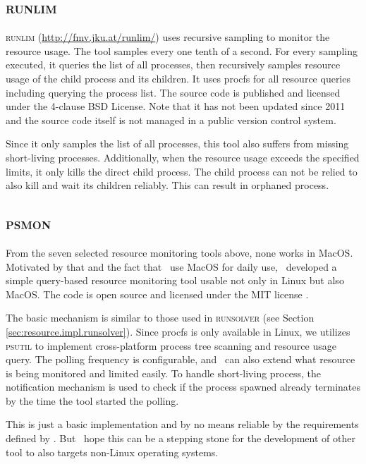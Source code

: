 \subsection{\textsc{runlim}}

\textsc{runlim} (\url{http://fmv.jku.at/runlim/}) uses recursive sampling to monitor the resource usage.
The tool samples every one tenth of a second.
For every sampling executed, it queries the list of all processes, then recursively samples resource usage of the child process and its children.
It uses procfs for all resource queries including querying the process list.
The source code is published and licensed under the 4-clause BSD License.
Note that it has not been updated since 2011 and the source code itself is not managed in a public version control system.

Since it only samples the list of all processes, this tool also suffers from missing short-living processes.
Additionally, when the resource usage exceeds the specified limits, it only kills the direct child process.
The child process can not be relied to also kill and wait its children reliably.
This can result in orphaned process.


\subsection{\textsc{psmon}}
\label{sec:res.psmon}

From the seven selected resource monitoring tools above, none works in MacOS.
Motivated by that and the fact that \first~use MacOS for daily use, \first~developed a simple query-based resource monitoring tool usable not only in Linux but also MacOS.
The code is open source and licensed under the MIT license \citep{kautsarPsmonMonitorsLimits2019}.

The basic mechanism is similar to those used in \textsc{runsolver} (see Section \ref{sec:resource.impl.runsolver}).
Since procfs is only available in Linux, we utilizes \textsc{psutil} to implement cross-platform process tree scanning and resource usage query.
The polling frequency is configurable, and \first~can also extend what resource is being monitored and limited easily.
To handle short-living process, the notification mechanism  is used to check if the process spawned already terminates by the time the tool started the polling.

This is just a basic implementation and by no means reliable by the requirements defined by \citet{beyerReliableBenchmarkingRequirements2019}.
But \first~hope this can be a stepping stone for the development of other tool to also targets non-Linux operating systems.

